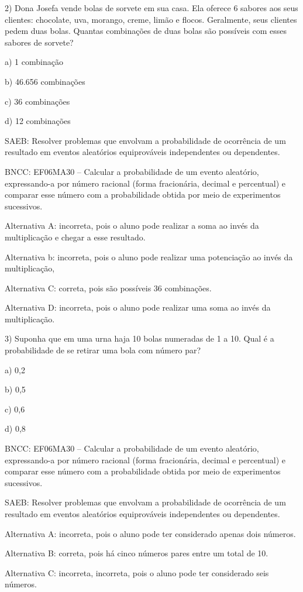 2) Dona Josefa vende bolas de sorvete em sua casa. Ela oferece 6 sabores
aos seus clientes: chocolate, uva, morango, creme, limão e flocos.
Geralmente, seus clientes pedem duas bolas. Quantas combinações de duas
bolas são possíveis com esses sabores de sorvete?

a) 1 combinação

b) 46.656 combinações

c) 36 combinações

d) 12 combinações

SAEB: Resolver problemas que envolvam a probabilidade de ocorrência de
um resultado em eventos aleatórios equiprováveis independentes ou
dependentes.

BNCC: EF06MA30 -- Calcular a probabilidade de um evento aleatório,
expressando-a por número racional (forma fracionária, decimal e
percentual) e comparar esse número com a probabilidade obtida por meio
de experimentos sucessivos.

Alternativa A: incorreta, pois o aluno pode realizar a soma ao invés da
multiplicação e chegar a esse resultado.

Alternativa b: incorreta, pois o aluno pode realizar uma potenciação ao
invés da multiplicação,

Alternativa C: correta, pois são possíveis 36 combinações.

Alternativa D: incorreta, pois o aluno pode realizar uma soma ao invés
da multiplicação.

3) Suponha que em uma urna haja 10 bolas numeradas de 1 a 10. Qual é a
probabilidade de se retirar uma bola com número par?

a) 0,2

b) 0,5

c) 0,6

d) 0,8

BNCC: EF06MA30 -- Calcular a probabilidade de um evento aleatório,
expressando-a por número racional (forma fracionária, decimal e
percentual) e comparar esse número com a probabilidade obtida por meio
de experimentos sucessivos.

SAEB: Resolver problemas que envolvam a probabilidade de ocorrência de
um resultado em eventos aleatórios equiprováveis independentes ou
dependentes.

Alternativa A: incorreta, pois o aluno pode ter considerado apenas dois
números.

Alternativa B: correta, pois há cinco números pares entre um total de
10.

Alternativa C: incorreta, incorreta, pois o aluno pode ter considerado
seis números.

